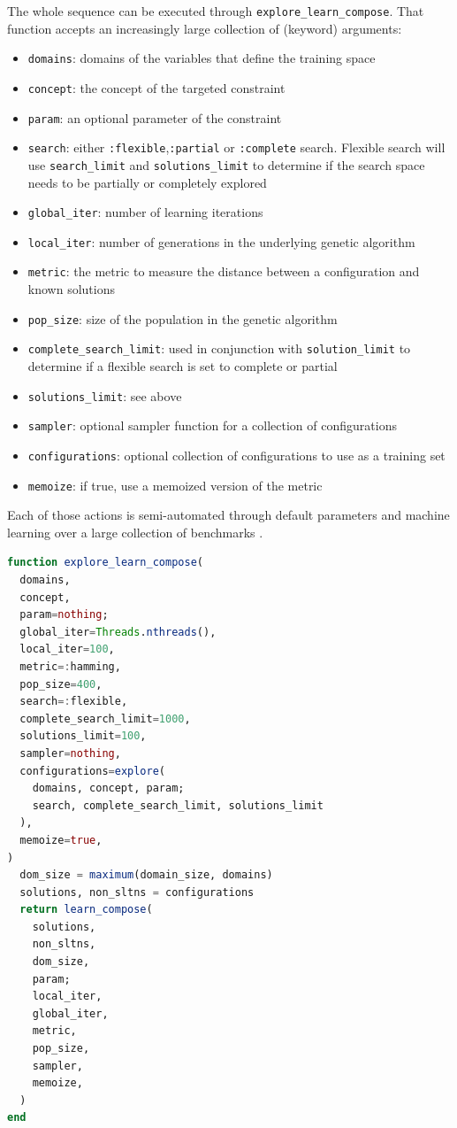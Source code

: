 \documentclass{juliacon}
\begin{document}
The whole sequence can be executed through \texttt{explore\_learn\_compose}. That function accepts an increasingly large collection of (keyword) arguments:
\begin{itemize}
  \item \texttt{domains}: domains of the variables that define the training space
  \item \texttt{concept}: the concept of the targeted constraint
  \item \texttt{param}: an optional parameter of the constraint
  \item \texttt{search}: either \texttt{:flexible},\texttt{:partial} or \texttt{:complete} search. Flexible search will use \texttt{search\_limit} and \texttt{solutions\_limit} to determine if the search space needs to be partially or completely explored
  \item \texttt{global\_iter}: number of learning iterations
  \item \texttt{local\_iter}: number of generations in the underlying genetic algorithm
  \item \texttt{metric}: the metric to measure the distance between a configuration and known solutions
  \item \texttt{pop\_size}: size of the population in the genetic algorithm
  \item \texttt{complete\_search\_limit}: used in conjunction with \texttt{solution\_limit} to determine if a flexible search is set to complete or partial
  \item \texttt{solutions\_limit}: see above
  \item \texttt{sampler}: optional sampler function for a collection of configurations
  \item \texttt{configurations}: optional collection of configurations to use as a training set
  \item \texttt{memoize}: if true, use a memoized version of the metric
\end{itemize}
Each of those actions is semi-automated through default parameters and machine learning over a large collection of benchmarks \cite{baffier2022interpretable}.

\begin{lstlisting}[language = Julia]
function explore_learn_compose(
  domains,
  concept,
  param=nothing;
  global_iter=Threads.nthreads(),
  local_iter=100,
  metric=:hamming,
  pop_size=400,
  search=:flexible,
  complete_search_limit=1000,
  solutions_limit=100,
  sampler=nothing,
  configurations=explore(
    domains, concept, param;
    search, complete_search_limit, solutions_limit
  ),
  memoize=true,
)
  dom_size = maximum(domain_size, domains)
  solutions, non_sltns = configurations
  return learn_compose(
    solutions,
    non_sltns,
    dom_size,
    param;
    local_iter,
    global_iter,
    metric,
    pop_size,
    sampler,
    memoize,
  )
end
\end{lstlisting}
\end{document}
